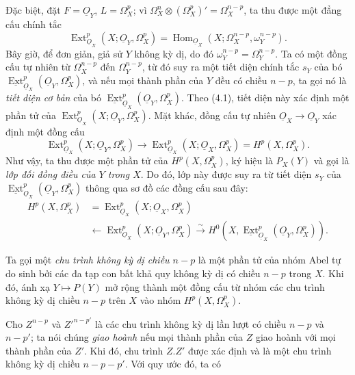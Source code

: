 \documentclass[11pt,twoside,openany]{book}
\numberwithin{equation}{section}
\newcommand{\Osh}{\underline{O}}
\newcommand{\Extsh}{\underline{\operatorname{Ext}}}
\begin{document}
Đặc biệt, đặt $F=\Osh_Y$, $L=\Omega_X^{p}$; vì
$\Omega_X^{n}\otimes(\Omega_X^{p})'=\Omega_X^{n-p}$, ta thu được một đẳng cấu
chính tắc
\begin{equation}\tag{4.2}
  \operatorname{Ext}_{\Osh_X}^{p}(X;\Osh_Y,\Omega_X^{p})
  =\operatorname{Hom}_{\Osh_X}
  (X;\Omega_X^{n-p},\omega_Y^{n-p}).
\end{equation}
Bây giờ, để đơn giản, giả sử $Y$ không kỳ dị, do đó
$\omega_Y^{n-p}=\Omega_Y^{n-p}$. Ta có một đồng cấu tự nhiên từ
$\Omega_X^{n-p}$ đến $\Omega_Y^{n-p}$, từ đó suy ra một tiết diện chính tắc $s_Y$ của
bó $\Extsh_{\Osh_X}^{p}(\Osh_Y,\Omega_X^{p})$, và nếu
mọi thành phần của $Y$ đều có chiều $n-p$, ta gọi nó là \emph{tiết diện
cơ bản} của bó $\Extsh_{\Osh_X}^{p}(\Osh_Y,\Omega_X^{p})$. Theo (4.1), tiết diện
này xác định một phần tử của
$\operatorname{Ext}_{\Osh_X}^{p}(X;\Osh_Y,\Omega_X^{p})$. Mặt khác, đồng cấu
tự nhiên $\Osh_X\longrightarrow\Osh_Y$ xác định một đồng cấu
\[
  \operatorname{Ext}_{\Osh_X}^{p}(X;\Osh_Y,\Omega_X^{p})
  \longrightarrow
  \operatorname{Ext}_{\Osh_X}^{p}(X;\Osh_X,\Omega_X^{p})
  =H^{p}(X,\Omega_X^{p}).
\]
Như vậy, ta thu được một phần tử của $H^{p}(X,\Omega_X^{p})$, ký hiệu là $P_X(Y)$ và gọi là
\emph{lớp đối đồng điều của $Y$ trong $X$}. Do đó, lớp này được suy ra từ tiết diện
$s_Y$ của $\Extsh_{\Osh_X}^{p}(\Osh_Y,\Omega_X^{p})$ thông qua sơ đồ
các đồng cấu sau đây:
\begin{equation}\tag{4.3}
\begin{aligned}
H^{p}(X,\Omega_X^{p})
&=\operatorname{Ext}_{\Osh_X}^{p}(X;\Osh_X,\Omega_X^{p})\\
&\longleftarrow\operatorname{Ext}_{\Osh_X}^{p}(X;\Osh_Y,\Omega_X^{p})
\xrightarrow{\ \sim\ }
H^{0}\!\left(X,\Extsh_{\Osh_X}^{p}(\Osh_Y,\Omega_X^{p})\right).
\end{aligned}
\end{equation}

Ta gọi một \emph{chu trình không kỳ dị chiều $n-p$} là một phần tử của nhóm
Abel tự do sinh bởi các đa tạp con bất khả quy không kỳ dị có
chiều $n-p$ trong $X$. Khi đó, ánh xạ $Y\longmapsto P(Y)$ mở rộng thành
một đồng cấu từ nhóm các chu trình không kỳ dị chiều $n-p$ trên $X$
vào nhóm $H^{p}(X,\Omega_X^{p})$.

Cho $Z^{n-p}$ và $Z'^{n-p'}$ là các chu trình không kỳ dị lần lượt có chiều $n-p$ và
$n-p'$; ta nói chúng \emph{giao hoành} nếu mọi thành phần
của $Z$ giao hoành với mọi thành phần của $Z'$. Khi đó, chu trình $Z.Z'$ được
xác định và là một chu trình không kỳ dị chiều $n-p-p'$. Với quy ước đó, ta có
\end{document}
